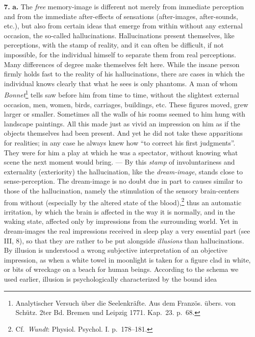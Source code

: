 \documentclass[12pt,a4paper]{book}
\newcommand{\opage}[1]{\marginnote{\footnotesize\textit{[#1]}}}
\begin{document}
\textbf{7.} \textbf{a.} The \emph{free} memory-image is different not
merely from immediate perception and from the immediate after-effects of
sensations (after-images, after-sounds, etc.), but also from certain ideas
that emerge from within without any external occasion, the so-called
hallucinations. Hallucinations present themselves, like perceptions, with
the stamp of reality, and it can often be difficult, if not impossible,
for the individual himself to separate them from real perceptions. Many
differences of degree make themselves felt here. While the insane person
firmly holds fast to the reality of his hallucinations, there are cases in
which the individual knows clearly that what he sees is only phantoms. A
man of whom
\emph{Bonnet}\footnote{Analytischer Versuch über die Seelenkräfte. Aus dem
Französ. übers. von Schütz. 2ter Bd. Bremen und Leipzig 1771. Kap.~23.
p.~68.} tells saw before him from time to time, without the slightest
external occasion, men, women, birds, carriages, buildings, etc. These
figures moved, grew larger or smaller. Sometimes all the walls of his rooms
seemed to him hung with landscape paintings. All this made just as vivid
an impression on him as if the objects themselves had been present. And
yet he did not take these apparitions for realities; in any case he always
knew how ``to correct his first judgments''. They were for him a play at
which he was a spectator, without knowing what scene the next moment
would bring. --- By this \emph{stamp} of involuntariness and externality
(exteriority) the hallucination, like the \emph{dream-image}, stands close
to sense-perception. The dream-image is no doubt due in part to causes
similar to those of the hallucination, namely the stimulation of the
sensory brain-centers from without (especially by the altered state of the
blood),\footnote{Cf.\ \emph{Wundt}: Physiol. Psychol. I. p.~178--181.}
thus an
\opage{177}automatic irritation, by which the brain is affected in the way
it is normally, and in the waking state, affected only by impressions from
the surrounding world. Yet in dream-images the real impressions received
in sleep play a very essential part (see III, 8), so that they are rather
to be put alongside \emph{illusions} than hallucinations. By illusion is
understood a wrong subjective interpretation of an objective impression,
as when a white towel in moonlight is taken for a figure clad in white, or
bits of wreckage on a beach for human beings. According to the schema we
used earlier, illusion is psychologically characterized by the bound idea
\end{document}
